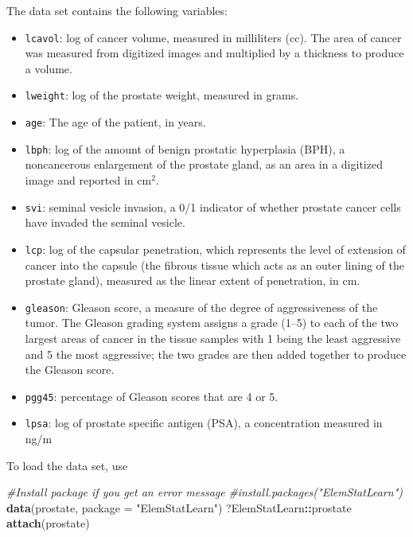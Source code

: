 \documentclass[]{book}
\newenvironment{Shaded}{\begin{snugshade}}{\end{snugshade}}
\newcommand{\CommentTok}[1]{\textcolor[rgb]{0.56,0.35,0.01}{\textit{#1}}}
\newcommand{\DataTypeTok}[1]{\textcolor[rgb]{0.13,0.29,0.53}{#1}}
\newcommand{\KeywordTok}[1]{\textcolor[rgb]{0.13,0.29,0.53}{\textbf{#1}}}
\newcommand{\NormalTok}[1]{#1}
\newcommand{\OperatorTok}[1]{\textcolor[rgb]{0.81,0.36,0.00}{\textbf{#1}}}
\newcommand{\StringTok}[1]{\textcolor[rgb]{0.31,0.60,0.02}{#1}}
\providecommand{\tightlist}{%
  \setlength{\itemsep}{0pt}\setlength{\parskip}{0pt}}
\theoremstyle{definition}
\theoremstyle{definition}
\theoremstyle{definition}
\theoremstyle{remark}
\begin{document}
The data set contains the following variables:

\begin{itemize}
\tightlist
\item
  \texttt{lcavol}: log of cancer volume, measured in milliliters (cc).
  The area of cancer was measured from digitized images and multiplied
  by a thickness to produce a volume.
\item
  \texttt{lweight}: log of the prostate weight, measured in grams.
\item
  \texttt{age}: The age of the patient, in years.
\item
  \texttt{lbph}: log of the amount of benign prostatic hyperplasia
  (BPH), a noncancerous enlargement of the prostate gland, as an area in
  a digitized image and reported in cm\({}^2\).
\item
  \texttt{svi}: seminal vesicle invasion, a 0/1 indicator of whether
  prostate cancer cells have invaded the seminal vesicle.
\item
  \texttt{lcp}: log of the capsular penetration, which represents the
  level of extension of cancer into the capsule (the fibrous tissue
  which acts as an outer lining of the prostate gland), measured as the
  linear extent of penetration, in cm.
\item
  \texttt{gleason}: Gleason score, a measure of the degree of
  aggressiveness of the tumor. The Gleason grading system assigns a
  grade (1--5) to each of the two largest areas of cancer in the tissue
  samples with 1 being the least aggressive and 5 the most aggressive;
  the two grades are then added together to produce the Gleason score.
\item
  \texttt{pgg45}: percentage of Gleason scores that are 4 or 5.
\item
  \texttt{lpsa}: log of prostate specific antigen (PSA), a concentration
  measured in ng/m
\end{itemize}

To load the data set, use

\begin{Shaded}
\begin{Highlighting}[]
\CommentTok{#Install package if you get an error message}
\CommentTok{#install.packages("ElemStatLearn")}
\KeywordTok{data}\NormalTok{(prostate, }\DataTypeTok{package =} \StringTok{"ElemStatLearn"}\NormalTok{)}
\NormalTok{?ElemStatLearn}\OperatorTok{::}\NormalTok{prostate}
\KeywordTok{attach}\NormalTok{(prostate) }
\end{Highlighting}
\end{Shaded}
\end{document}
